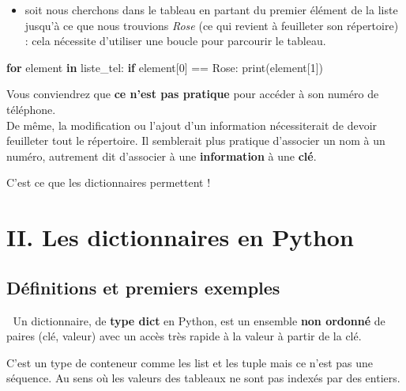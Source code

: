 \documentclass[
]{article}
\newenvironment{Shaded}{}{}
\newcommand{\BuiltInTok}[1]{#1}
\newcommand{\ControlFlowTok}[1]{\textcolor[rgb]{0.00,0.44,0.13}{\textbf{#1}}}
\newcommand{\DecValTok}[1]{\textcolor[rgb]{0.25,0.63,0.44}{#1}}
\newcommand{\KeywordTok}[1]{\textcolor[rgb]{0.00,0.44,0.13}{\textbf{#1}}}
\newcommand{\NormalTok}[1]{#1}
\newcommand{\OperatorTok}[1]{\textcolor[rgb]{0.40,0.40,0.40}{#1}}
\newcommand{\StringTok}[1]{\textcolor[rgb]{0.25,0.44,0.63}{#1}}
\providecommand{\tightlist}{%
  \setlength{\itemsep}{0pt}\setlength{\parskip}{0pt}}
\begin{document}
\begin{itemize}
\tightlist
\item
  soit nous cherchons dans le tableau en partant du premier élément de
  la liste jusqu'à ce que nous trouvions \emph{Rose} (ce qui revient à
  feuilleter son répertoire) : cela nécessite d'utiliser une boucle pour
  parcourir le tableau.
\end{itemize}

\begin{Shaded}
\begin{Highlighting}[]
\ControlFlowTok{for}\NormalTok{ element }\KeywordTok{in}\NormalTok{ liste\_tel:}
    \ControlFlowTok{if}\NormalTok{ element[}\DecValTok{0}\NormalTok{] }\OperatorTok{==} \StringTok{\textquotesingle{}Rose\textquotesingle{}}\NormalTok{:}
        \BuiltInTok{print}\NormalTok{(element[}\DecValTok{1}\NormalTok{])}
\end{Highlighting}
\end{Shaded}

Vous conviendrez que \textbf{ce n'est pas pratique} pour accéder à son
numéro de téléphone.\\
De même, la modification ou l'ajout d'un information nécessiterait de
devoir feuilleter tout le répertoire. Il semblerait plus pratique
d'associer un nom à un numéro, autrement dit d'associer à une
\textbf{information} à une \textbf{clé}.

C'est ce que les dictionnaires permettent !

\hypertarget{ii.-les-dictionnaires-en-python}{%
\section{II. Les dictionnaires en
Python}\label{ii.-les-dictionnaires-en-python}}

\hypertarget{duxe9finitions-et-premiers-exemples}{%
\subsection{Définitions et premiers
exemples}\label{duxe9finitions-et-premiers-exemples}}

💜 Un dictionnaire, de \textbf{type dict} en Python, est un ensemble
\textbf{non ordonné} de paires (clé, valeur) avec un accès très rapide à
la valeur à partir de la clé.

C'est un type de conteneur comme les list et les tuple mais ce n'est pas
une séquence. Au sens où les valeurs des tableaux ne sont pas indexés
par des entiers.
\end{document}
